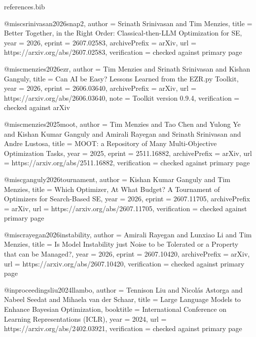 \begin{filecontents*}[overwrite]{references.bib}

@misc{srinivasan2026snap2,
  author = {Srinath Srinivasan and Tim Menzies},
  title = {Better Together, in the Right Order: Classical-then-{LLM} Optimization for {SE}},
  year = {2026},
  eprint = {2607.02583},
  archivePrefix = {arXiv},
  url = {https://arxiv.org/abs/2607.02583},
  verification = {checked against primary page}
}

@misc{menzies2026ezr,
  author = {Tim Menzies and Srinath Srinivasan and Kishan Ganguly},
  title = {Can {AI} be Easy? {L}essons Learned from the {EZR.py} Toolkit},
  year = {2026},
  eprint = {2606.03640},
  archivePrefix = {arXiv},
  url = {https://arxiv.org/abs/2606.03640},
  note = {Toolkit version 0.9.4},
  verification = {checked against arXiv}
}

@misc{menzies2025moot,
  author = {Tim Menzies and Tao Chen and Yulong Ye and Kishan Kumar Ganguly and Amirali Rayegan and Srinath Srinivasan and Andre Lustosa},
  title = {{MOOT}: a Repository of Many Multi-Objective Optimization Tasks},
  year = {2025},
  eprint = {2511.16882},
  archivePrefix = {arXiv},
  url = {https://arxiv.org/abs/2511.16882},
  verification = {checked against primary page}
}

@misc{ganguly2026tournament,
  author = {Kishan Kumar Ganguly and Tim Menzies},
  title = {Which Optimizer, At What Budget? {A} Tournament of Optimizers for Search-Based {SE}},
  year = {2026},
  eprint = {2607.11705},
  archivePrefix = {arXiv},
  url = {https://arxiv.org/abs/2607.11705},
  verification = {checked against primary page}
}

@misc{rayegan2026instability,
  author = {Amirali Rayegan and Lunxiao Li and Tim Menzies},
  title = {Is Model Instability just Noise to be Tolerated or a Property that can be Managed?},
  year = {2026},
  eprint = {2607.10420},
  archivePrefix = {arXiv},
  url = {https://arxiv.org/abs/2607.10420},
  verification = {checked against primary page}
}

@inproceedings{liu2024llambo,
  author = {Tennison Liu and Nicol{\'a}s Astorga and Nabeel Seedat and Mihaela van der Schaar},
  title = {Large Language Models to Enhance {B}ayesian Optimization},
  booktitle = {International Conference on Learning Representations (ICLR)},
  year = {2024},
  url = {https://arxiv.org/abs/2402.03921},
  verification = {checked against primary page}
}


\end{filecontents*}
